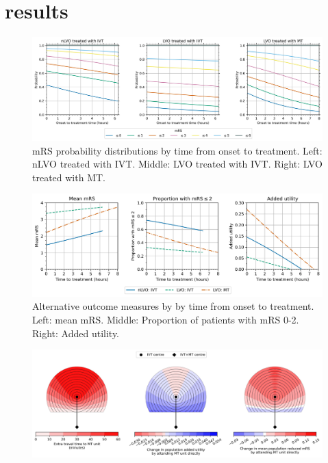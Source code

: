 \section{results}


\begin{figure}
\centering
\includegraphics[width=1.0\textwidth]{./images/probs_with_time}
\caption{mRS probability distributions by time from onset to treatment. Left: nLVO treated with IVT. Middle: LVO treated with IVT. Right: LVO treated with MT.}
\label{fig:probs_with_time}
\end{figure}


\begin{figure}
\centering
\includegraphics[width=1.0\textwidth]{./images/time_to_treatment}
\caption{Alternative outcome measures by by time from onset to treatment. Left: mean mRS. Middle: Proportion of patients with mRS 0-2. Right: Added utility.}
\label{fig:added_utility_six_in_one}
\end{figure}


\begin{figure}
\centering
\includegraphics[width=1.0\textwidth]{./images/circle_plots_t-IVT-to-MT=60_t-onset-to-ambo=60}
\caption{}
\label{fig:added_utility_six_in_one}
\end{figure}

